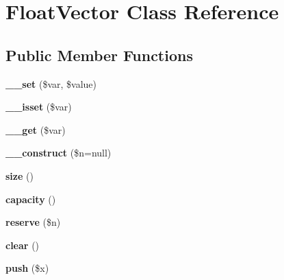\hypertarget{class_float_vector}{\section{Float\-Vector Class Reference}
\label{class_float_vector}
}
\subsection*{Public Member Functions}
\begin{DoxyCompactItemize}
\item 
\hypertarget{class_float_vector_a3af1235863ee0432d8bd85b603d1ba50}{{\bfseries \-\_\-\-\_\-set} (\$var, \$value)}\label{class_float_vector_a3af1235863ee0432d8bd85b603d1ba50}

\item 
\hypertarget{class_float_vector_a60a2add626dd0b56433e5a3d457d5f81}{{\bfseries \-\_\-\-\_\-isset} (\$var)}\label{class_float_vector_a60a2add626dd0b56433e5a3d457d5f81}

\item 
\hypertarget{class_float_vector_a69d083b3567dabfe57589192dacb0aa8}{{\bfseries \-\_\-\-\_\-get} (\$var)}\label{class_float_vector_a69d083b3567dabfe57589192dacb0aa8}

\item 
\hypertarget{class_float_vector_a0b02145e1b5beca1c1b9ca4cc672e1d7}{{\bfseries \-\_\-\-\_\-construct} (\$n=null)}\label{class_float_vector_a0b02145e1b5beca1c1b9ca4cc672e1d7}

\item 
\hypertarget{class_float_vector_a25b3b499ee22a394c804fd1de856f591}{{\bfseries size} ()}\label{class_float_vector_a25b3b499ee22a394c804fd1de856f591}

\item 
\hypertarget{class_float_vector_a880ad496f719a2c9dc9c384f5be8fd50}{{\bfseries capacity} ()}\label{class_float_vector_a880ad496f719a2c9dc9c384f5be8fd50}

\item 
\hypertarget{class_float_vector_a29ced707756842998e48ae4aa88150b2}{{\bfseries reserve} (\$n)}\label{class_float_vector_a29ced707756842998e48ae4aa88150b2}

\item 
\hypertarget{class_float_vector_add145a78f5fd4e69fb8606b212f4c7f4}{{\bfseries clear} ()}\label{class_float_vector_add145a78f5fd4e69fb8606b212f4c7f4}

\item 
\hypertarget{class_float_vector_a580d0ecba937b8989c9207fc1d8845b3}{{\bfseries push} (\$x)}\label{class_float_vector_a580d0ecba937b8989c9207fc1d8845b3}


\end{DoxyCompactItemize}
